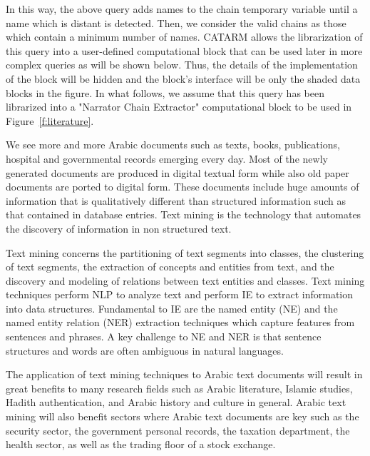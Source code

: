 \documentclass[12pt]{article}
\begin{document}
In this way, the above query adds names to the chain temporary variable until a name which is distant is detected. Then, we consider the valid chains as those which contain a minimum number of names. CATARM allows the librarization of this query into a user-defined computational block that can be used later in more complex queries as will be shown below. Thus, the details of the implementation of the block will be hidden and the block's interface will be only the shaded data blocks in the figure. In what follows, we assume that this query has been librarized into a "Narrator Chain Extractor" computational block to be used in Figure~\ref{f:literature}.

\begin{figure}
\end{figure}

\pagebreak


We see more and more Arabic documents such as texts,
books, publications, hospital and governmental records emerging 
every day.
Most of the newly generated documents are produced in digital 
textual form while also old paper documents are ported to digital 
form.
These documents include huge amounts of information that is 
qualitatively different than structured information such as that 
contained in database entries.
Text mining is the technology that automates the discovery of 
information in non structured text.

Text mining concerns the partitioning of text segments into classes,
the clustering of text segments,
the extraction of concepts and entities from text,
and the discovery and modeling of relations between text entities 
and classes.
Text mining techniques perform NLP to analyze text and perform 
IE to extract information into data structures.
Fundamental to IE are the named entity (NE) and the named entity 
relation (NER) extraction techniques which capture features from 
sentences and phrases.
A key challenge to NE and NER is that sentence structures and 
words are often ambiguous in natural languages.

The application of text mining techniques to Arabic text documents 
will result in great benefits to many research fields such as 
Arabic literature,
Islamic studies, Hadith authentication, and Arabic history and 
culture in general.
Arabic text mining will also benefit sectors where Arabic text 
documents are key such as the security sector,
the government personal records,
the taxation department,
the health sector,
as well as the trading floor of a stock exchange.
 
\end{document}

